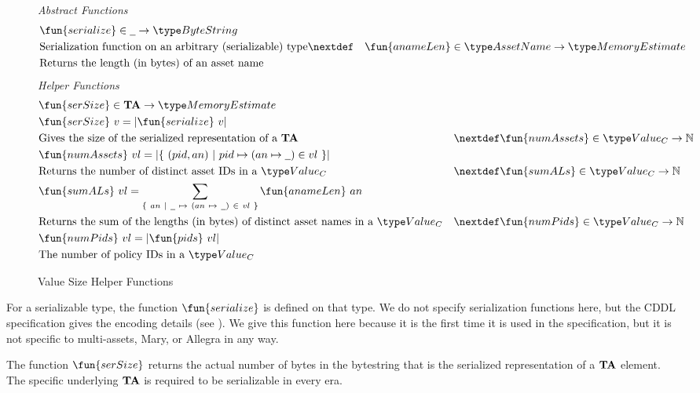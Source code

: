 \begin{figure*}[h]
  \emph{Abstract Functions}
  \begin{align*}
    & \fun{serialize} \in \wcard \to \ByteString \\
    & \text{Serialization function on an arbitrary (serializable) type}
    \nextdef
    & \fun{anameLen} \in \AssetName \to \MemoryEstimate \\
    & \text{Returns the length (in bytes) of an asset name}
  \end{align*}
  \emph{Helper Functions}
  \begin{align*}
    & \fun{serSize} \in \ValMonoid \to \MemoryEstimate \\
    & \fun{serSize}~v=\lvert \fun{serialize}~{v} \rvert \\
    & \text{Gives the size of the serialized representation of a $\ValMonoid$}
    & \nextdef
    & \fun{numAssets} \in \Value_C \to \N \\
    & \fun{numAssets}~{vl}=\lvert \{~(pid, an)~\vert~ pid \mapsto (an \mapsto \wcard) \in vl~\} \rvert \\
    & \text{Returns the number of distinct asset IDs in a $\Value_C$}
    & \nextdef
    & \fun{sumALs} \in \Value_C \to \N \\
    & \fun{sumALs}~{vl}= \sum_{\{~an~\vert~\wcard~\mapsto~(an~\mapsto~\wcard)~\in~vl~\}} \fun{anameLen}~an \\
    & \text{Returns the sum of the lengths (in bytes) of distinct asset names in a $\Value_C$}
    & \nextdef
    & \fun{numPids} \in \Value_C \to \N \\
    & \fun{numPids}~{vl} = \lvert \fun{pids}~{vl} \rvert \\
    & \text{The number of policy IDs in a $\Value_C$}
  \end{align*}
  \caption{Value Size Helper Functions}
  \label{fig:size-helper}
\end{figure*}

For a serializable type, the function $\fun{serialize}$ is defined on that type. We do not
specify serialization functions here, but the CDDL specification gives the encoding
details (see \cite{alonzoCDDL}). We give this function here because it is the
first time it is used in the specification, but it is not specific to
multi-assets, Mary, or Allegra in any way.

The function $\fun{serSize}$ returns the actual number of bytes in the bytestring that is the
    serialized representation of a $\mathbf{TA}$ element. The specific underlying $\mathbf{TA}$
    is required to be serializable in every era.

